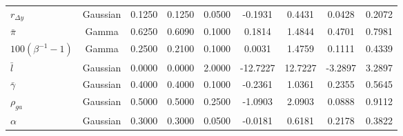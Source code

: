 \begin{center}
\begin{longtable}{lcccccccc}
$ {r_{\Delta y}} $ & Gaussian & 0.1250 & 0.1250 & 0.0500 & -0.1931 & 0.4431 & 0.0428 & 0.2072 \\ 
$ {\bar \pi} $ & Gamma & 0.6250 & 0.6090 & 0.1000 & 0.1814 & 1.4844 & 0.4701 & 0.7981 \\ 
$ {100(\beta^{-1}-1)} $ & Gamma & 0.2500 & 0.2100 & 0.1000 & 0.0031 & 1.4759 & 0.1111 & 0.4339 \\ 
$ {\bar l} $ & Gaussian & 0.0000 & 0.0000 & 2.0000 & -12.7227 & 12.7227 & -3.2897 & 3.2897 \\ 
$ {\bar \gamma} $ & Gaussian & 0.4000 & 0.4000 & 0.1000 & -0.2361 & 1.0361 & 0.2355 & 0.5645 \\ 
$ {\rho_{ga}} $ & Gaussian & 0.5000 & 0.5000 & 0.2500 & -1.0903 & 2.0903 & 0.0888 & 0.9112 \\ 
$ {\alpha} $ & Gaussian & 0.3000 & 0.3000 & 0.0500 & -0.0181 & 0.6181 & 0.2178 & 0.3822 \\ 
\end{longtable}
 \end{center}
